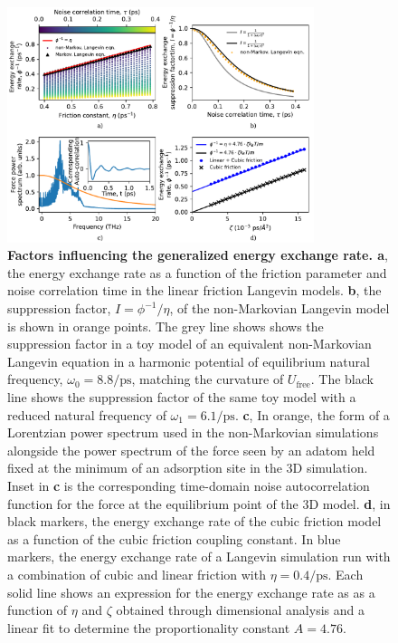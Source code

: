 \documentclass[7pt]{article}
\newcommand{\ips}{\si{\per\pico\second}}
\begin{document}
\begin{figure}
	\centering
	\includegraphics[width=0.8\textwidth]{energy_exchange_rates}
	\caption{\textbf{Factors influencing the generalized energy exchange rate. a}, the energy exchange rate as a function of the friction parameter and noise correlation time in the linear friction Langevin models. \textbf{b}, the suppression factor, $I=\phi^{-1}/\eta$, of the non-Markovian Langevin model is shown in orange points. The grey line shows shows the suppression factor in a toy model of an equivalent non-Markovian Langevin equation in a harmonic potential of equilibrium natural frequency, $\omega_0=8.8\ips$, matching the curvature of $U_{\text{free}}$. The black line shows the suppression factor of the same toy model with a reduced natural frequency of $\omega_1=6.1\ips$. \textbf{c}, In orange, the form of a Lorentzian power spectrum used in the non-Markovian simulations alongside the power spectrum of the force seen by an adatom held fixed at the minimum of an adsorption site in the 3D simulation. Inset in \textbf{c} is the corresponding time-domain noise autocorrelation function for the force at the equilibrium point of the 3D model. \textbf{d}, in black markers, the energy exchange rate of the cubic friction model as a function of the cubic friction coupling constant. In blue markers, the energy exchange rate of a Langevin simulation run with a combination of cubic and linear friction with $\eta=0.4\ips$. Each solid line shows an expression for the energy exchange rate as as a function of $\eta$ and $\zeta$ obtained through dimensional analysis and a linear fit to determine the proportionality constant $A=4.76$.} 
	\label{fig:energy_exchange_rates}
\end{figure}
\end{document}
